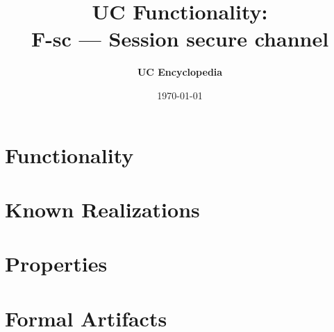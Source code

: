 \documentclass[11pt,a4paper]{article}
\title{\textbf{\Large UC Functionality:}\\[0.2em] \Large F-sc --- Session secure channel}
\author{\textbf{UC Encyclopedia}}
\date{\today}
\newtheorem{functionality}{Functionality}
\begin{document}
\maketitle

\begin{abstract}
\end{abstract}

\section{Functionality}

%

\section{Known Realizations}


\section{Properties}


\section{Formal Artifacts}

\end{document}
